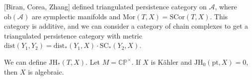 [Biran, Corea, Zhang] defined triangulated persistence category on $\mathcal{A}$, where $\text{ob}(\mathcal{A})$ are symplectic manifolds and $\text{Mor}(T,X)=\text{SCor}(T,X)$. This category is additive, and we can consider a category of chain complexes to get a triangulated persistence category with metric $\text{dist}(Y_1, Y_2)=\text{dist}_*(Y_1,X) \cdot \text{SC}_*(Y_2,X)$.

We can define $\text{JH}_*(T,X)$. Let $M=\mathbb{CP}^\times$. If $X$ is Kähler and $\text{JH}_0(\text{pt}, X)=0$, then $X$ is algebraic.